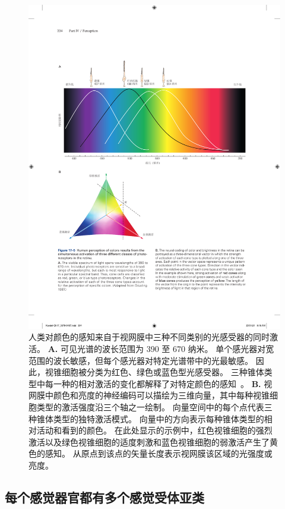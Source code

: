 \begin{figure}[htbp]
	\centering
	\includegraphics[width=1.0\linewidth]{chap17/fig_17_5}
	\caption{人类对颜色的感知来自于视网膜中三种不同类别的光感受器的同时激活。 
		\textbf{A.} 可见光谱的波长范围为 390 至 670 纳米。 
		单个感光器对宽范围的波长敏感，但每个感光器对特定光谱带中的光最敏感。 
		因此，视锥细胞被分类为红色、绿色或蓝色型光感受器。 
		三种锥体类型中每一种的相对激活的变化都解释了对特定颜色的感知~\cite{dowling1987retina}。
		\textbf{B.} 视网膜中颜色和亮度的神经编码可以描绘为三维向量，其中每种视锥细胞类型的激活强度沿三个轴之一绘制。 
		向量空间中的每个点代表三种锥体类型的独特激活模式。
		向量中的方向表示每种锥体类型的相对活动和看到的颜色。
		在此处显示的示例中，红色视锥细胞的强烈激活以及绿色视锥细胞的适度刺激和蓝色视锥细胞的弱激活产生了黄色的感知。
		从原点到该点的矢量长度表示视网膜该区域的光强度或亮度。}
	\label{fig:17_5}
\end{figure}



\subsection{每个感觉器官都有多个感觉受体亚类}

